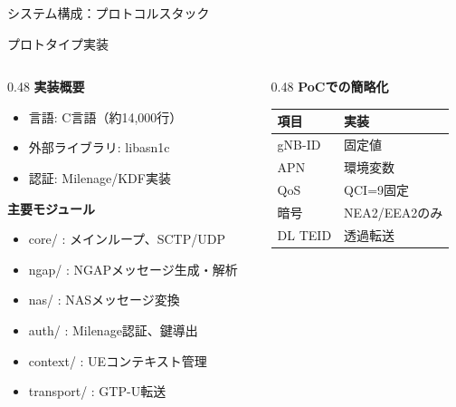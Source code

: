 \documentclass[dvipdfmx,11pt,aspectratio=169]{beamer}
\begin{document}
\begin{frame}{システム構成：プロトコルスタック}
\end{frame}

\begin{frame}{プロトタイプ実装}
  \begin{columns}[T]
    \begin{column}{0.48\textwidth}
      \textbf{実装概要}
      \begin{itemize}
        \item 言語: C言語（約14,000行）
        \item 外部ライブラリ: libasn1c
        \item 認証: Milenage/KDF実装
      \end{itemize}

      \vspace{0.3cm}
      \textbf{主要モジュール}
      \begin{itemize}
        \item core/ : メインループ、SCTP/UDP
        \item ngap/ : NGAPメッセージ生成・解析
        \item nas/ : NASメッセージ変換
        \item auth/ : Milenage認証、鍵導出
        \item context/ : UEコンテキスト管理
        \item transport/ : GTP-U転送
      \end{itemize}
    \end{column}
    \begin{column}{0.48\textwidth}
      \textbf{PoCでの簡略化}
      \begin{table}
        \tiny
        \begin{tabular}{|l|l|}
          \hline
          \textbf{項目} & \textbf{実装} \\
          \hline
          gNB-ID & 固定値 \\
          \hline
          APN & 環境変数 \\
          \hline
          QoS & QCI=9固定 \\
          \hline
          暗号 & NEA2/EEA2のみ \\
          \hline
          DL TEID & 透過転送 \\
          \hline
        \end{tabular}
      \end{table}


\end{column}
\end{columns}
\end{frame}
\end{document}
